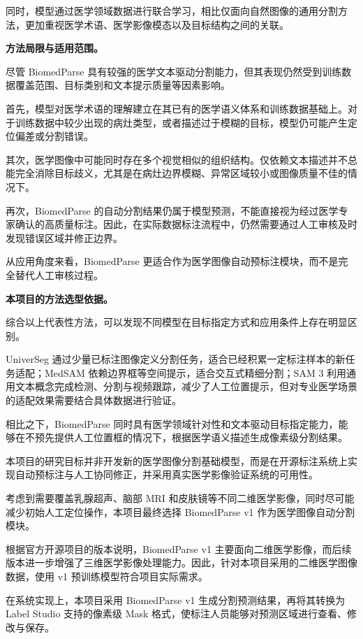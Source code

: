 \documentclass[10.5pt,compsoc]{CjC}
\theoremstyle{mystyle}
\begin{document}
同时，模型通过医学领域数据进行联合学习，相比仅面向自然图像的通用分割方法，更加重视医学术语、医学影像模态以及目标结构之间的关联。

\noindent\textbf{方法局限与适用范围。}

尽管 BiomedParse 具有较强的医学文本驱动分割能力，但其表现仍然受到训练数据覆盖范围、目标类别和文本提示质量等因素影响。

首先，模型对医学术语的理解建立在其已有的医学语义体系和训练数据基础上。对于训练数据中较少出现的病灶类型，或者描述过于模糊的目标，模型仍可能产生定位偏差或分割错误。

其次，医学图像中可能同时存在多个视觉相似的组织结构。仅依赖文本描述并不总能完全消除目标歧义，尤其是在病灶边界模糊、异常区域较小或图像质量不佳的情况下。

再次，BiomedParse 的自动分割结果仍属于模型预测，不能直接视为经过医学专家确认的高质量标注。因此，在实际数据标注流程中，仍然需要通过人工审核及时发现错误区域并修正边界。

从应用角度来看，BiomedParse 更适合作为医学图像自动预标注模块，而不是完全替代人工审核过程。

\noindent\textbf{本项目的方法选型依据。}

综合以上代表性方法，可以发现不同模型在目标指定方式和应用条件上存在明显区别。

UniverSeg 通过少量已标注图像定义分割任务，适合已经积累一定标注样本的新任务适配；MedSAM 依赖边界框等空间提示，适合交互式精细分割；SAM 3 利用通用文本概念完成检测、分割与视频跟踪，减少了人工位置提示，但对专业医学场景的适配效果需要结合具体数据进行验证。

相比之下，BiomedParse 同时具有医学领域针对性和文本驱动目标指定能力，能够在不预先提供人工位置框的情况下，根据医学语义描述生成像素级分割结果。

本项目的研究目标并非开发新的医学图像分割基础模型，而是在开源标注系统上实现自动预标注与人工协同修正，并采用真实医学影像验证系统的可用性。

考虑到需要覆盖乳腺超声、脑部 MRI 和皮肤镜等不同二维医学影像，同时尽可能减少初始人工定位操作，本项目最终选择 BiomedParse v1 作为医学图像自动分割模块。

根据官方开源项目的版本说明，BiomedParse v1 主要面向二维医学影像，而后续版本进一步增强了三维医学影像处理能力。因此，针对本项目采用的二维医学图像数据，使用 v1 预训练模型符合项目实际需求。

在系统实现上，本项目采用 BiomedParse v1 生成分割预测结果，再将其转换为 Label Studio 支持的像素级 Mask 格式，使标注人员能够对预测区域进行查看、修改与保存。
\end{document}
